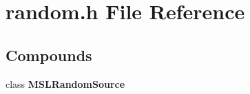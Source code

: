\section{random.h File Reference}
\label{random_h}
\subsection*{Compounds}
\begin{CompactItemize}
\item 
class {\bf MSLRandom\-Source}
\end{CompactItemize}
